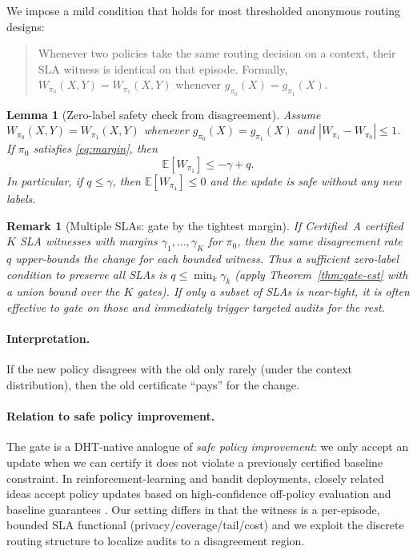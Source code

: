 \documentclass[11pt]{article}
\newtheorem{lemma}{Lemma}
\newtheorem{remark}{Remark}
\begin{document}
We impose a mild condition that holds for most thresholded anonymous routing designs:
\begin{quote}
Whenever two policies take the same routing decision on a context, their SLA witness is identical on that episode.
Formally, $W_{\pi_0}(X,Y)=W_{\pi_1}(X,Y)$ whenever $g_{\pi_0}(X)=g_{\pi_1}(X)$.
\end{quote}

\begin{lemma}[Zero-label safety check from disagreement]
\label{lem:disagree}
Assume $W_{\pi_0}(X,Y)=W_{\pi_1}(X,Y)$ whenever $g_{\pi_0}(X)=g_{\pi_1}(X)$ and $|W_{\pi_1}-W_{\pi_0}|\le 1$.
If $\pi_0$ satisfies \eqref{eq:margin}, then
\[
\mathbb{E}[W_{\pi_1}] \le -\gamma + q.
\]
In particular, if $q\le \gamma$, then $\mathbb{E}[W_{\pi_1}]\le 0$ and the update is safe \emph{without any new labels}.
\end{lemma}

\begin{remark}[Multiple SLAs: gate by the tightest margin]
If Certified~A certified $K$ SLA witnesses with margins $\gamma_1,\dots,\gamma_K$ for $\pi_0$, then the same disagreement rate $q$ upper-bounds the change for each bounded witness.
Thus a sufficient zero-label condition to preserve \emph{all} SLAs is $q\le \min_k \gamma_k$ (apply Theorem~\ref{thm:gate-est} with a union bound over the $K$ gates).
If only a subset of SLAs is near-tight, it is often effective to gate on those and immediately trigger targeted audits for the rest.
\end{remark}

\paragraph{Interpretation.}
If the new policy disagrees with the old only rarely (under the context distribution), then the old certificate ``pays'' for the change.

\paragraph{Relation to safe policy improvement.}
The gate is a DHT-native analogue of \emph{safe policy improvement}: we only accept an update when we can certify it does not violate a previously certified baseline constraint.
In reinforcement-learning and bandit deployments, closely related ideas accept policy updates based on high-confidence off-policy evaluation and baseline guarantees \cite{thomas2015hcope,laroche2019spibb}.
Our setting differs in that the witness is a per-episode, bounded SLA functional (privacy/coverage/tail/cost) and we exploit the discrete routing structure to localize audits to a disagreement region.
\end{document}

